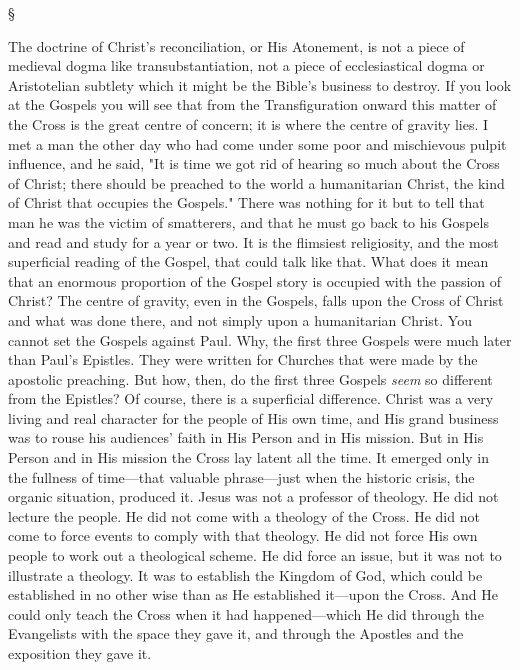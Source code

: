 \documentclass[12pt,a5paper,twoside,titlepage]{book}
\begin{document}
\begin{center}
\S
\end{center}


The doctrine of Christ's reconciliation, or His 
Atonement, is not a piece of medieval dogma 
like transubstantiation, not a piece of ecclesiastical 
dogma or Aristotelian subtlety which 
it might be the Bible's business to destroy. If 
you look at the Gospels you will see that from 
the Transfiguration onward this matter of 
the Cross is the great centre of concern; it 
is where the centre of gravity lies. I met a 
man the other day who had come under some 
poor and mischievous pulpit influence, and he 
said, "It is time we got rid of hearing so much 
about the Cross of Christ; there should be 
preached to the world a humanitarian Christ, 
the kind of Christ that occupies the Gospels." 
There was nothing for it but to tell that man 
he was the victim of smatterers, and that he 
must go back to his Gospels and read and study 
for a year or two. It is the flimsiest religiosity, 
and the most superficial reading of the Gospel, 
that could talk like that. What does it mean 
that an enormous proportion of the Gospel 
story is occupied with the passion of Christ? 
The centre of gravity, even in the Gospels, falls 
upon the Cross of Christ and what was done 
there, and not simply upon a humanitarian 
Christ. You cannot set the Gospels against 
Paul. Why, the first three Gospels were much 
later than Paul's Epistles. They were written 
for Churches that were made by the apostolic 
preaching. But how, then, do the first three 
Gospels \textit{seem} so different from the Epistles? Of 
course, there is a superficial difference. Christ 
was a very living and real character for the 
people of His own time, and His grand business 
was to rouse his audiences' faith in His Person 
and in His mission. But in His Person and in 
His mission the Cross lay latent all the time. 
It emerged only in the fullness of time---that 
valuable phrase---just when the historic crisis, 
the organic situation, produced it. Jesus was 
not a professor of theology. He did not lecture 
the people. He did not come with a theology 
of the Cross. He did not come to force events 
to comply with that theology. He did not 
force His own people to work out a theological 
scheme. He did force an issue, but it 
was not to illustrate a theology. It was to 
establish the Kingdom of God, which could 
be established in no other wise than as He 
established it---upon the Cross. And He could 
only teach the Cross when it had happened---which 
He did through the Evangelists with the 
space they gave it, and through the Apostles 
and the exposition they gave it. 
\end{document}
